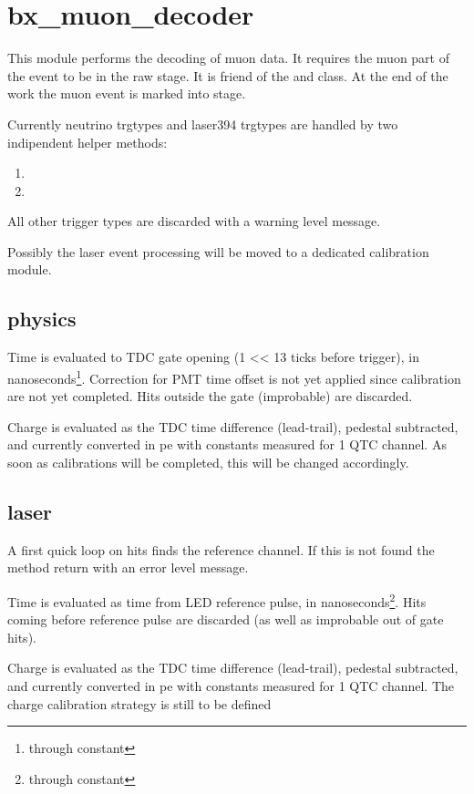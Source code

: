 \section{bx\_muon\_decoder}

This module performs the decoding of muon data. It requires the muon part of the event to be in the raw stage.
It is friend of the  and  class.
At the end of the work the muon event is marked into  stage.

Currently neutrino trgtypes and laser394 trgtypes are handled by two indipendent helper methods:
\begin{enumerate}
\item {}
\item {}
\end{enumerate}
All other trigger types are discarded with a warning level message.

Possibly the laser event processing will be moved to a dedicated calibration module.

\subsection{physics}

Time is evaluated to TDC gate opening (1 << 13 ticks before trigger), in nanoseconds\footnote{through constant }.
Correction for PMT time offset is not yet applied since calibration are not yet completed.
Hits outside the gate (improbable) are discarded.

Charge is evaluated as the TDC time difference (lead-trail), pedestal subtracted, and currently converted in pe with constants measured for 1 QTC channel.
As soon as calibrations will be completed, this will be changed accordingly.

\subsection{laser}

A first quick loop on hits finds the reference channel.
If this is not found the method return with an error level message. 

Time is evaluated as time from LED reference pulse, in nanoseconds\footnote{through constant }.
Hits coming before reference pulse are discarded (as well as improbable out of gate hits).

Charge is evaluated as the TDC time difference (lead-trail), pedestal subtracted, and currently converted in pe with constants measured for 1 QTC channel.
The charge calibration strategy is still to be defined
